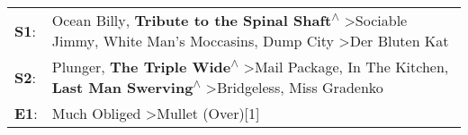 \begin{supertabular}{p{0.03\textwidth}p{0.92\textwidth}}
 \textbf{S1}:  &                                        Ocean Billy\textsuperscript{}, \enspace \textbf{Tribute to the Spinal Shaft\textsuperscript{$\wedge$}} \textgreater \enspace Sociable Jimmy\textsuperscript{}, \enspace White Man's Moccasins\textsuperscript{}, \enspace Dump City\textsuperscript{} \textgreater \enspace Der Bluten Kat\textsuperscript{}  \enspace  \\
 \textbf{S2}:  &  Plunger\textsuperscript{}, \enspace \textbf{The Triple Wide\textsuperscript{$\wedge$}} \textgreater \enspace Mail Package\textsuperscript{}, \enspace In The Kitchen\textsuperscript{}, \enspace \textbf{Last Man Swerving\textsuperscript{$\wedge$}} \textgreater \enspace Bridgeless\textsuperscript{}, \enspace Miss Gradenko\textsuperscript{}  \enspace  \\
 \textbf{E1}:  &                                                                                                                                                                                                                                                             Much Obliged\textsuperscript{} \textgreater \enspace Mullet (Over)[1]\textsuperscript{}  \enspace  \\
\end{supertabular}
